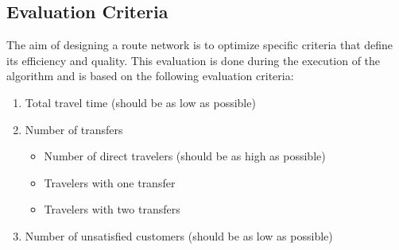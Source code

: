 \subsection{Evaluation Criteria} 
The aim of designing a route network is to optimize specific criteria that define its efficiency and quality. This evaluation is done during the execution of the algorithm and is based on the following evaluation criteria:
\begin{enumerate}
\item \label{itm:criteriaTotalTravelTime} Total travel time (should be as low as possible)
\item \label{itm:f2} Number of transfers
\begin{itemize}
\item Number of direct travelers (should be as high as possible)
\item Travelers with one transfer
\item Travelers with two transfers
\end{itemize}
\item \label{itm:TODO} Number of unsatisfied customers (should be as low as possible)
\end{enumerate}




